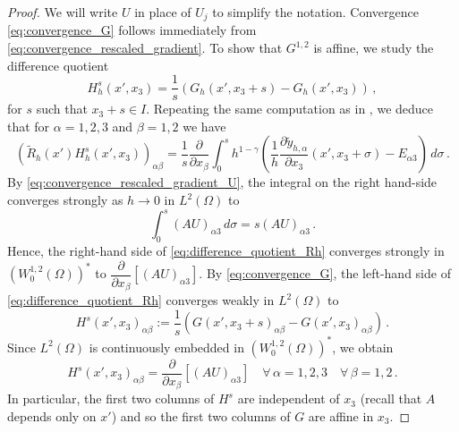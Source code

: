 \documentclass{article}
\theoremstyle{plain}
\theoremstyle{plain}
\theoremstyle{plain}
\theoremstyle{plain}
\theoremstyle{plain}
\theoremstyle{definition}
\theoremstyle{definition}
\newcommand{\dpartial}[2]{\dfrac{\partial#1}{\partial#2}}
\begin{document}
\begin{proof}
    We will write $U$ in place of $U_j$ to simplify the notation. Convergence \eqref{eq:convergence_G} follows immediately from \eqref{eq:convergence_rescaled_gradient}. To show that $G^{1,2}$ is affine, we study the difference quotient
    \[
        H^s_h(x', x_3) = \dfrac{1}{s}(G_h(x',x_3+s) - G_h(x', x_3)) \,,
    \]
    for $s$ such that $x_3 + s \in I$. Repeating the same computation as in , we deduce that for $\alpha = 1, 2, 3$ and $\beta = 1, 2$ we have
    \begin{equation}\label{eq:difference_quotient_Rh}
        {(\tilde R_h(x') H_h^s(x', x_3))}_{\alpha \beta} = \dfrac{1}{s} \dpartial{}{x_\beta} \int_0^s  h^{1-\gamma} \left(\dfrac{1}{h} \dpartial{\tilde y_{h, \alpha}}{x_3}(x', x_3 + \sigma) - E_{\alpha 3}\right)\, d\sigma \,.
    \end{equation}
    By \eqref{eq:convergence_rescaled_gradient_U}, the integral on the right hand-side converges strongly as $h \to 0$ in $L^2(\Omega)$ to
    \[
        \int_0^s {(AU)}_{\alpha 3} \, d\sigma = s{(AU)}_{\alpha 3} \,.
    \]
    Hence, the right-hand side of \eqref{eq:difference_quotient_Rh} converges strongly in $(W^{1,2}_0(\Omega))^\ast$ to $\dpartial{}{x_\beta} [{(AU)}_{\alpha 3}]$. By \eqref{eq:convergence_G}, the left-hand side of \eqref{eq:difference_quotient_Rh} converges weakly in $L^2(\Omega)$ to
    \begin{equation}\label{eq:difference_quotient_limit}
        {H^s(x', x_3)}_{\alpha \beta} := \dfrac{1}{s}({G(x', x_3+s)}_{\alpha \beta} - {G(x', x_3)}_{\alpha \beta}) \,. \label{eq:definition_H_s}
    \end{equation}
    Since $L^2(\Omega)$ is continuously embedded in $(W^{1,2}_0(\Omega))^\ast$, we obtain 
    \begin{equation} \label{eq:difference_quotient_structure}
        {H^s(x', x_3)}_{\alpha \beta} = \dpartial{}{x_\beta} [{(AU)}_{\alpha 3}] \quad \forall \, \alpha =1, 2, 3 \quad \forall \, \beta = 1, 2 \,.
    \end{equation}
    In particular, the first two columns of $H^s$ are independent of $x_3$ (recall that $A$ depends only on $x'$) and so the first two columns of $G$ are affine in $x_3$. 


\end{proof}
\end{document}
